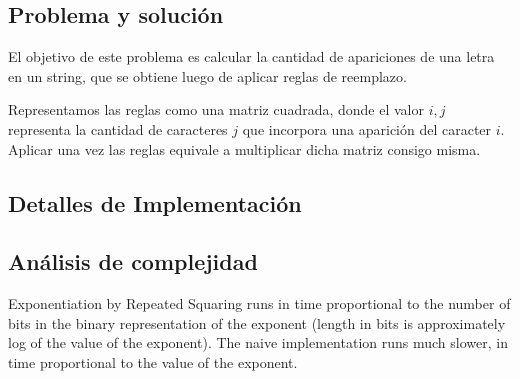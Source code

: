 \subsection*{Problema y solución}

El objetivo de este problema es calcular la cantidad de apariciones de una
letra en un string, que se obtiene luego de aplicar reglas de reemplazo.

Representamos las reglas como una matriz cuadrada, donde el valor $i,j$
representa la cantidad de caracteres $j$ que incorpora una aparición del
caracter $i$. Aplicar una vez las reglas equivale a multiplicar dicha matriz
consigo misma.


\subsection*{Detalles de Implementación}

\subsection*{Análisis de complejidad}

Exponentiation by Repeated Squaring runs in time proportional to the number of
bits in the binary representation of the exponent (length in bits is
approximately log of the value of the exponent). The naive implementation runs
much slower, in time proportional to the value of the exponent.
